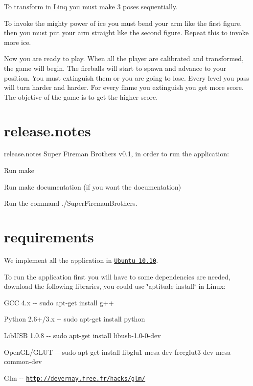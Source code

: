 To transform in \hyperlink{classLinq}{Linq} you must make 3 poses sequentially.

  

To invoke the mighty power of ice you must bend your arm like the first figure, then you must put your arm straight like the second figure. Repeat this to invoke more ice.

 

Now you are ready to play. When all the player are calibrated and transformed, the game will begin. The fireballs will start to spawn and advance to your position. You must extinguish them or you are going to lose. Every level you pass will turn harder and harder. For every flame you extinguish you get more score. The objetive of the game is to get the higher score.



 \hypertarget{index_notes}{}\section{release.notes}\label{index_notes}
release.notes Super Fireman Brothers v0.1, in order to run the application:
\begin{DoxyItemize}
\item Run make
\item Run make documentation (if you want the documentation)
\item Run the command ./SuperFiremanBrothers.
\end{DoxyItemize}



 \hypertarget{index_requirements}{}\section{requirements}\label{index_requirements}
We implement all the application in \href{http://www.ubuntu.com/}{\tt Ubuntu 10.10}.

To run the application first you will have to some dependencies are needed, download the following libraries, you could use \char`\"{}aptitude install\char`\"{} in Linux:


\begin{DoxyItemize}
\item GCC 4.x -\/-\/ sudo apt-\/get install g++
\item Python 2.6+/3.x -\/-\/ sudo apt-\/get install python
\item LibUSB 1.0.8 -\/-\/ sudo apt-\/get install libusb-\/1.0-\/0-\/dev
\item OpenGL/GLUT -\/-\/ sudo apt-\/get install libglu1-\/mesa-\/dev freeglut3-\/dev mesa-\/common-\/dev
\item Glm -\/-\/ \href{http://devernay.free.fr/hacks/glm/}{\tt http://devernay.free.fr/hacks/glm/}
\end{DoxyItemize}

